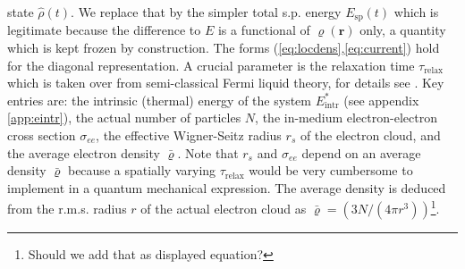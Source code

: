\documentclass[final,1p]{elsarticle}
\newcommand{\PGRfoot}[1]{{\color{blue}\footnote{\color{blue} #1}}}
\begin{document}
state $\hat{\rho}(t)$. We replace that by the simpler total s.p.
energy $E_\mathrm{sp}(t)$ which is legitimate because the difference
to $E$ is a functional of $\varrho(\mathbf{r})$ only, a quantity which
is kept frozen by construction.  The forms
(\ref{eq:locdens},\ref{eq:current}) hold for the diagonal
representation.  A crucial parameter is the relaxation time
$\tau_\mathrm{relax}$ which is taken over from semi-classical Fermi
liquid theory, for details see \cite{Rei15a}.  Key entries are: the
intrinsic (thermal) energy of the system $E^*_\mathrm{intr}$ (see
appendix \ref{app:eintr}), the actual number of particles $N$, the
in-medium electron-electron cross section $\sigma_{ee}$, the effective
Wigner-Seitz radius $r_s$ of the electron cloud, and the average
electron density $\bar{\varrho}$.  Note that $r_s$ and $\sigma_{ee}$
depend on an average density $\bar{\varrho}$ because a spatially
varying $\tau_\mathrm{relax}$ would be very cumbersome to implement in
a quantum mechanical expression.  The average density is deduced from
the r.m.s. radius $r$ of the actual electron cloud as
$\bar{\varrho}=(3N/(4\pi r^3))$\PGRfoot{Should we add that as
  displayed equation?}.
\end{document}
